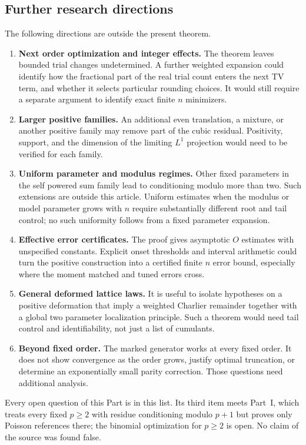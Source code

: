 \subsection{Further research directions}
The following directions are outside the present theorem.
\begin{enumerate}
\item \textbf{Next order optimization and integer effects.} The theorem leaves bounded trial changes undetermined. A further weighted expansion could identify how the fractional part of the real trial count enters the next TV term, and whether it selects particular rounding choices. It would still require a separate argument to identify exact finite $n$ minimizers.
\item \textbf{Larger positive families.} An additional even translation, a mixture, or another positive family may remove part of the cubic residual. Positivity, support, and the dimension of the limiting $L^1$ projection would need to be verified for each family.
\item \textbf{Uniform parameter and modulus regimes.} Other fixed parameters in the self powered sum family lead to conditioning modulo more than two. Such extensions are outside this article. Uniform estimates when the modulus or model parameter grows with $n$ require substantially different root and tail control; no such uniformity follows from a fixed parameter expansion.
\item \textbf{Effective error certificates.} The proof gives asymptotic $O$ estimates with unspecified constants. Explicit onset thresholds and interval arithmetic could turn the positive construction into a certified finite $n$ error bound, especially where the moment matched and tuned errors cross.
\item \textbf{General deformed lattice laws.} It is useful to isolate hypotheses on a positive deformation that imply a weighted Charlier remainder together with a global two parameter localization principle. Such a theorem would need tail control and identifiability, not just a list of cumulants.
\item \textbf{Beyond fixed order.} The marked generator works at every fixed order. It does not show convergence as the order grows, justify optimal truncation, or determine an exponentially small parity correction. Those questions need additional analysis.
\end{enumerate}
\begin{writenote}
Every open question of this Part is in this list. Its third item meets Part~I,
which treats every fixed $p\ge2$ with residue conditioning modulo $p+1$ but
proves only Poisson references there; the binomial optimization for $p\ge2$ is
open. No claim of the source was found false.
\end{writenote}
